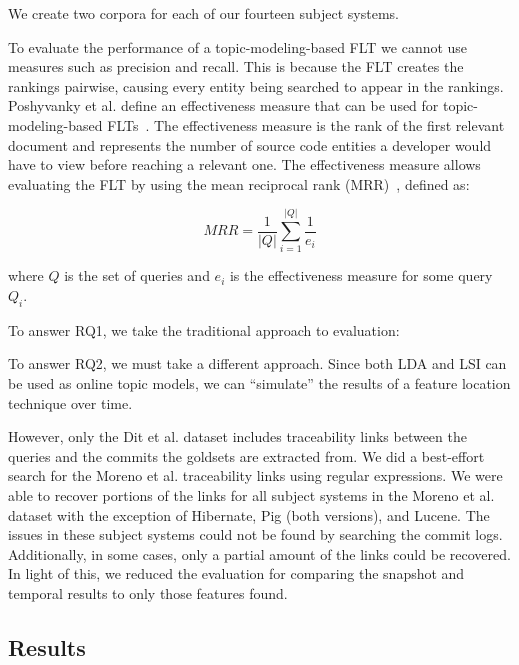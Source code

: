 We create two corpora for each of our fourteen subject systems.

To evaluate the performance of a topic-modeling-based FLT we cannot use
measures such as precision and recall. This is because the FLT creates
the rankings pairwise, causing every entity being searched to appear in the rankings.
Poshyvanky et al. define an effectiveness measure that can be used for topic-modeling-based FLTs~\cite{Poshyvanyk-etal:2007}.
The effectiveness measure is the rank of the first relevant document
and represents the number of source code entities a developer would have to view before reaching a relevant one.
The effectiveness measure allows evaluating the FLT by using 
the mean reciprocal rank (MRR)~\cite{Voorhees:1999}, defined as:

\begin{equation}
    MRR = \frac{1}{|Q|} \sum_{i=1}^{|Q|} \frac{1}{e_i}
\end{equation}

where $Q$ is the set of queries
and $e_i$ is the effectiveness measure for some query $Q_i$.

To answer RQ1, we take the traditional approach to evaluation:

To answer RQ2, we must take a different approach.
Since both LDA and LSI can be used as online topic models, we can
``simulate'' the results of a feature location technique over time.

However, only the Dit et al. dataset includes traceability links between
the queries and the commits the goldsets are extracted from.
We did a best-effort search for the Moreno et al. traceability links
using regular expressions.
We were able to recover portions of the links for all subject systems in
the Moreno et al. dataset with the exception of Hibernate, Pig (both versions), and Lucene.
The issues in these subject systems could not be found by searching the commit logs.
Additionally, in some cases, only a partial amount of the links could be
recovered. In light of this, we reduced the evaluation for comparing the
snapshot and temporal results to only those features found.



\subsection{Results}

